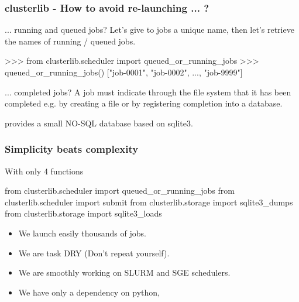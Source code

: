 \documentclass[11pt,compress,serif]{beamer}
\begin{document}
\begin{frame}[fragile=singleslide]
\frametitle{clusterlib - How to avoid re-launching ... ?}

\begin{block}{... running and queued jobs?}
Let's give to jobs a unique name, then let's retrieve
the names of running / queued jobs. 

\begin{pythoncode}
>>> from clusterlib.scheduler import queued_or_running_jobs
>>> queued_or_running_jobs()
["job-0001", "job-0002", ..., "job-9999"]
\end{pythoncode}

\end{block}


\begin{block}{... completed jobs?}
A job must indicate through the file system that it has been completed e.g. by
creating a file or by registering completion into a database.

 provides a small NO-SQL database based on sqlite3.
\end{block}

\end{frame}



\begin{frame}[fragile=singleslide]
\frametitle{Simplicity beats complexity}


With only 4 functions

\begin{pythoncode}
from clusterlib.scheduler import queued_or_running_jobs
from clusterlib.scheduler import submit 
from clusterlib.storage import sqlite3_dumps
from clusterlib.storage import sqlite3_loads
\end{pythoncode}

\begin{itemize}
    \item We launch easily thousands of jobs.
    \item We are task DRY (Don't repeat yourself).
    \item We are smoothly working on SLURM and SGE schedulers.
    \item We have only a dependency on python, 
\end{itemize}    

\end{frame}

\end{document}
